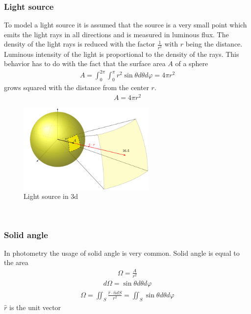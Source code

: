 \subsubsection{Light source}
To model a light source it is assumed that the source is a very small point which emits the light rays in all directions and is measured in luminous flux. The density of the light rays is reduced with the factor $\frac{1}{r^2}$ with $r$ being the distance. Luminous intensity of the light is proportional to the density of the rays. This behavior has to do with the fact that the surface area $A$ of a sphere
\begin{align*}
A=\int_{0}^{2 \pi} \int_{0}^{\pi} r^{2} \sin \theta d \theta d \varphi=4 \pi r^{2}
\end{align*}
grows squared with the distance from the center $r$.
\begin{align*}
A = 4\pi r^2
\end{align*}
\begin{figure}[ht]
	\centering
	\includegraphics[width=0.6\textwidth]{2-theory/backlight/light.pdf}
	\caption{Light source in 3d\label{theory:light}}
\end{figure} 
\\
\subsubsection{Solid angle}
In photometry the usage of solid angle is very common. Solid angle is equal to the area 
\begin{align*}
\Omega=\frac{A}{r^{2}}
\end{align*}
\begin{align*}
d \Omega=\sin \theta d \theta d \varphi
\end{align*}
\begin{align*}
\Omega=\iint_{S} \frac{\hat{r} \cdot \hat{n} d S}{r^{2}}=\iint_{S} \sin \theta d \theta d \varphi
\end{align*}
$\hat{r}$ is the unit vector
